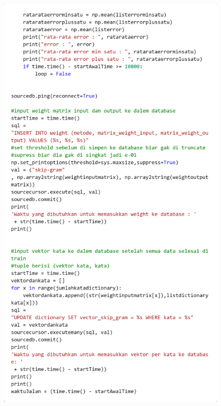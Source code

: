 \documentclass[12pt]{report}
\begin{document}
\begin{figure}[H]
\centering
\includegraphics[scale=0.3]{training6}
\end{figure}
\end{document}
